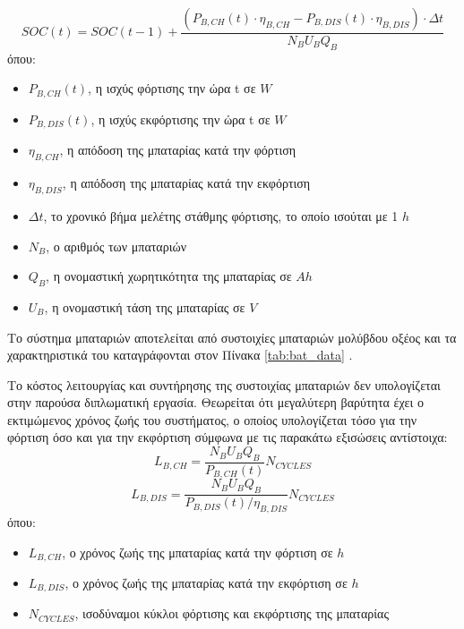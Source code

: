 \begin{equation}
    SOC(t)=SOC(t-1)+\frac{(P_{B,CH}(t) \cdot η_{B,CH}-P_{B,DIS}(t) \cdot η_{B,DIS}) \cdot Δt}{Ν_{Β}U_{Β}Q_{Β}} \label{SOC}
\end{equation}
όπου:
\begin{itemize}
  \item[] $P_{B,CH}(t)$, η ισχύς φόρτισης την ώρα t σε $W$
  \\
  \item[] $P_{B,DIS}(t)$, η ισχύς εκφόρτισης την ώρα t σε $W$
  \\
  \item[] $η_{B,CH}$, η απόδοση της μπαταρίας κατά την φόρτιση 
  \\
  \item[] $η_{B,DIS}$, η απόδοση της μπαταρίας κατά την εκφόρτιση 
  \\
  \item[] $Δt$, το χρονικό βήμα μελέτης στάθμης φόρτισης, το οποίο ισούται με 1 $h$
  \\
  \item[] $N_B$, ο αριθμός των μπαταριών 
  \\
  \item[] $Q_B$, η ονομαστική χωρητικότητα της μπαταρίας σε $Ah$ 
  \\
  \item[] $U_B$, η ονομαστική τάση της μπαταρίας σε $V$ 
  \\
\end{itemize}

Το σύστημα μπαταριών αποτελείται από συστοιχίες μπαταριών μολύβδου οξέος και τα χαρακτηριστικά του καταγράφονται στον Πίνακα \ref{tab:bat_data} \cite{CAU2014820}.

Το κόστος λειτουργίας και συντήρησης της συστοιχίας μπαταριών δεν υπολογίζεται στην παρούσα διπλωματική εργασία. Θεωρείται ότι μεγαλύτερη βαρύτητα έχει ο εκτιμώμενος χρόνος ζωής του συστήματος, ο οποίος υπολογίζεται τόσο για την φόρτιση όσο και για την εκφόρτιση σύμφωνα με τις παρακάτω εξισώσεις αντίστοιχα:  
    \begin{equation}
        L_{B,CH} = \frac{N_B U_B Q_B}{P_{B,CH}(t)}N_{CYCLES} \label{L_B_CH}
    \end{equation}
    \begin{equation}
        L_{B,DIS} = \frac{N_B U_B Q_B}{P_{B,DIS}(t)/η_{B,DIS}}N_{CYCLES} \label{L_B_DIS}
    \end{equation}
όπου:
\begin{itemize}
    \item[] $L_{B,CH}$, ο χρόνος ζωής της μπαταρίας κατά την φόρτιση σε $h$
    \\
    \item[] $L_{B,DIS}$, ο χρόνος ζωής της μπαταρίας κατά την εκφόρτιση σε $h$
    \\
    \item[] $N_{CYCLES}$, ισοδύναμοι κύκλοι φόρτισης και εκφόρτισης της μπαταρίας 
\end{itemize}

